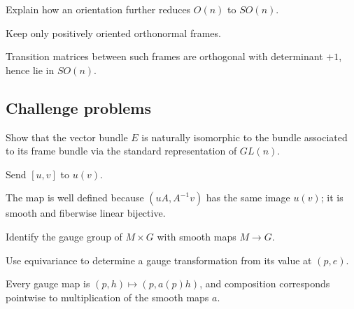 \begin{exercise}\label{exr:vii08-ped-14}
Explain how an orientation further reduces \(O(n)\) to \(SO(n)\).
\end{exercise}
\begin{hint}
Keep only positively oriented orthonormal frames.
\end{hint}
\begin{solution}
Transition matrices between such frames are orthogonal with determinant \(+1\), hence lie in \(SO(n)\).
\end{solution}

\subsection*{Challenge problems}

\begin{exercise}\label{exr:vii08-ped-15}
Show that the vector bundle \(E\) is naturally isomorphic to the bundle associated to its frame bundle via the standard representation of \(GL(n)\).
\end{exercise}
\begin{hint}
Send \([u,v]\) to \(u(v)\).
\end{hint}
\begin{solution}
The map is well defined because \((uA,A^{-1}v)\) has the same image \(u(v)\); it is smooth and fiberwise linear bijective.
\end{solution}

\begin{exercise}\label{exr:vii08-ped-16}
Identify the gauge group of \(M\times G\) with smooth maps \(M\to G\).
\end{exercise}
\begin{hint}
Use equivariance to determine a gauge transformation from its value at \((p,e)\).
\end{hint}
\begin{solution}
Every gauge map is \((p,h)\mapsto(p,a(p)h)\), and composition corresponds pointwise to multiplication of the smooth maps \(a\).
\end{solution}

